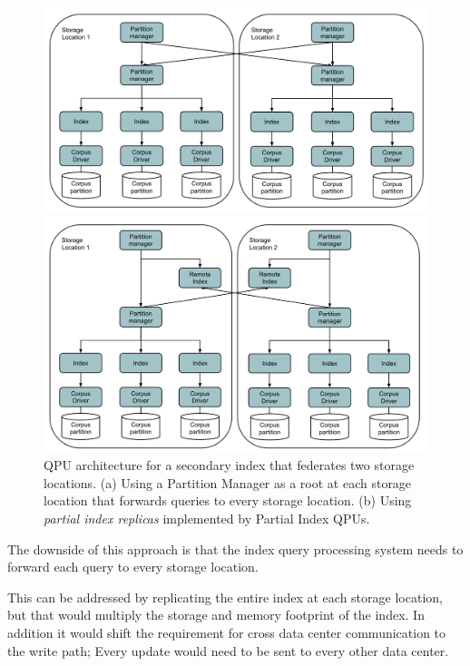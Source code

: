 \begin{figure}
  \begin{minipage}{.5\textwidth}
    \centering
    \includegraphics[scale=0.24]{./figures/case_studies/federated_index.pdf}
  \end{minipage}%
  \begin{minipage}{.5\textwidth}
    \centering
    \includegraphics[scale=0.24]{./figures/case_studies/federated_index_remote.pdf}
  \end{minipage}
  \caption{QPU architecture for a secondary index that federates two storage locations.
  (a) Using a Partition Manager as a root at each storage location that forwards queries to every storage location.
  (b) Using \textit{partial index replicas} implemented by Partial Index QPUs.}
  \label{fig:federated_index}
\end{figure}

\medskip
\noindent
The downside of this approach is that the index query processing system needs to forward each query to every
storage location.

This can be addressed by replicating the entire index at each storage location,
but that would multiply the storage and memory footprint of the index.
In addition it would shift the requirement for cross data center communication to the write path;
Every update would need to be sent to every other data center.

